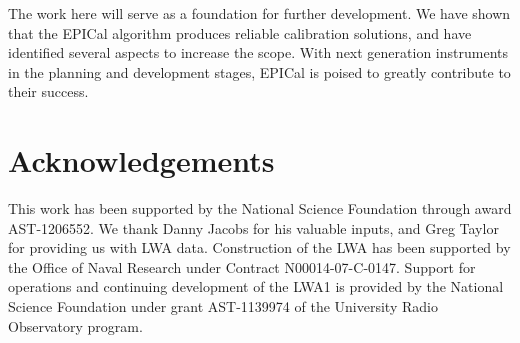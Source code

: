 \documentclass[a4paper,fleqn,usenatbib]{../mnras}
\begin{document}
The work here will serve as a foundation for further development. We have shown that the EPICal algorithm produces reliable calibration solutions, and have identified several aspects to increase the scope. With next generation instruments in the planning and development stages, EPICal is poised to greatly contribute to their success.

\section*{Acknowledgements}
This work has been supported by the National Science Foundation through award AST-1206552. 
We thank Danny Jacobs for his valuable inputs, and Greg Taylor for providing us with LWA data. 
Construction of the LWA has been supported by the Office of Naval Research under 
Contract N00014-07-C-0147. Support for operations and continuing development of 
the LWA1 is provided by the National Science Foundation under grant AST-1139974 
of the University Radio Observatory program.















\bsp	%
\label{lastpage}
\end{document}
